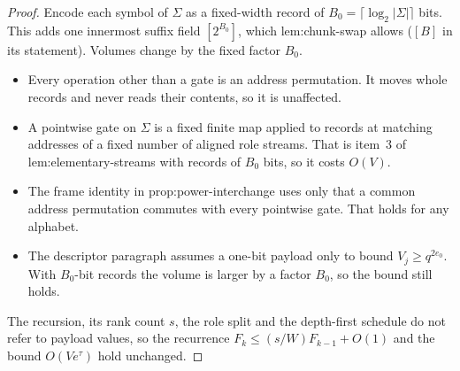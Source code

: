 \documentclass[11pt]{article}
\theoremstyle{remark}\newtheorem*{remark}{Remark}
\begin{document}
\begin{proof}
Encode each symbol of $\Sigma$ as a fixed-width record of $B_0=\lceil\log_2|\Sigma|\rceil$ bits.
This adds one innermost suffix field $[2^{B_0}]$, which lem:chunk-swap allows ($[B]$ in its
statement). Volumes change by the fixed factor $B_0$.
\begin{itemize}
\item Every operation other than a gate is an address permutation. It moves whole records and
never reads their contents, so it is unaffected.
\item A pointwise gate on $\Sigma$ is a fixed finite map applied to records at matching
addresses of a fixed number of aligned role streams. That is item~3 of lem:elementary-streams
with records of $B_0$ bits, so it costs $O(V)$.
\item The frame identity in prop:power-interchange uses only that a common address permutation
commutes with every pointwise gate. That holds for any alphabet.
\item The descriptor paragraph assumes a one-bit payload only to bound $V_j\ge q^{2e_0}$. With
$B_0$-bit records the volume is larger by a factor $B_0$, so the bound still holds.
\end{itemize}
The recursion, its rank count $s$, the role split and the depth-first schedule do not refer to
payload values, so the recurrence $F_k\le(s/W)F_{k-1}+O(1)$ and the bound $O(Ve^\tau)$ hold
unchanged.
\end{proof}
\end{document}
